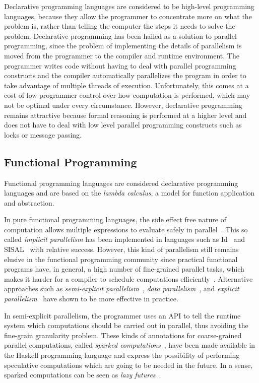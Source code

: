 Declarative programming languages are considered to be high-level programming
languages, because they allow the programmer to concentrate more on what the
problem is, rather than telling the computer the steps it needs to solve the
problem. Declarative programming has been hailed as a solution to 
parallel programming, since the problem of implementing the details of
parallelism is moved from the programmer to the compiler and runtime
environment. The programmer writes code without having to deal with parallel
programming constructs and the compiler automatically parallelizes the program
in order to take advantage of multiple threads of execution. Unfortunately, this
comes at a cost of low programmer control over how computation is performed,
which may not be optimal under every circumstance. However, declarative
programming remains attractive because formal reasoning is performed at a higher
level and does not have to deal with low level parallel programming constructs
such as locks or message passing.

\subsection{Functional Programming}

Functional programming languages are considered declarative programming
languages and are based on the \emph{lambda calculus}, a model for function
application and abstraction.

In pure functional programming languages, the side effect free nature of
computation allows multiple expressions to evaluate safely in
parallel~\cite{Loidl:2003}. This so called \emph{implicit parallelism} has been
implemented in languages such as Id~\cite{Nikhil93anoverview} and
SISAL~\cite{gaudiot2001sisal} with relative success. However, this kind of
parallelism still remains elusive in the functional programming community since
practical functional programs have, in general, a high number of fine-grained
parallel tasks, which makes it harder for a compiler to schedule computations
efficiently~\cite{haskell_tutorial}.  Alternative approaches such as
\emph{semi-explicit parallelism}~\cite{Marlow:2010}, \emph{data
parallelism}~\cite{Blelloch:1996:PPA:227234.227246,Chakravarty07dataparallel,peytonjones:2008},
and \emph{explicit parallelism}~\cite{harris2005composable} have shown to be
more effective in practice.

In semi-explicit parallelism, the programmer uses an API to tell the runtime
system which computations should be carried out in parallel, thus avoiding the
fine-grain granularity problem. These kinds of annotations for coarse-grained
parallel computations, called \emph{sparked computations}~\cite{Marlow:2010},
have been made available in the Haskell programming language and express the
possibility of performing speculative computations which are going to be needed
in the future. In a sense, sparked computations can be seen as \emph{lazy
futures}~\cite{Baker:1977}.

